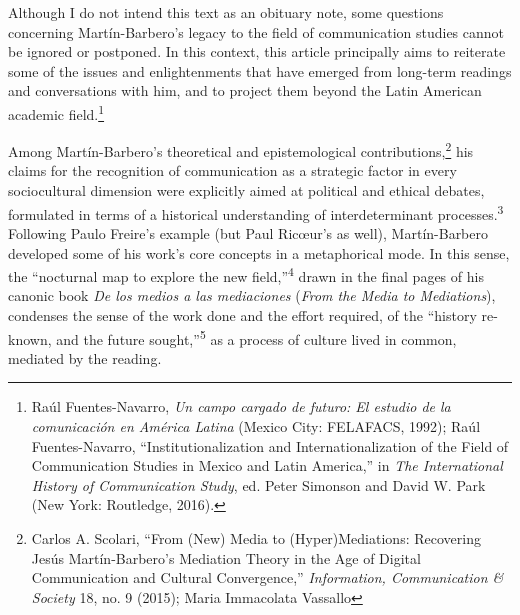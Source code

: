 \documentclass{tufte-handout}
\begin{document}
\begin{titlepage}
Although I do not intend this text as an obituary note, some questions
concerning Martín-Barbero's legacy to the field of communication studies
cannot be ignored or postponed. In this context, this article
principally aims to reiterate some of the issues and enlightenments that
have emerged from long-term readings and conversations with him, and to
project them beyond the Latin American academic
field.\footnote{Raúl Fuentes-Navarro, \emph{Un campo cargado de futuro: El estudio de
  la comunicación en América Latina} (Mexico City: FELAFACS, 1992); Raúl
  Fuentes-Navarro, ``Institutionalization and Internationalization of
  the Field of Communication Studies in Mexico and Latin America,'' in
  \emph{The International History of Communication Study}, ed. Peter
  Simonson and David W. Park (New York: Routledge, 2016).
}

Among Martín-Barbero's theoretical and epistemological
contributions,\footnote{Carlos A. Scolari, ``From (New) Media to (Hyper)Mediations: Recovering
  Jesús Martín-Barbero's Mediation Theory in the Age of Digital
  Communication and Cultural Convergence,'' \emph{Information,
  Communication \& Society} 18, no. 9 (2015); Maria Immacolata Vassallo}
his claims for the
recognition of communication as a strategic factor in every
sociocultural dimension were explicitly aimed at political and ethical
debates, formulated in terms of a historical understanding of
interdeterminant processes.\textsuperscript{3}
Following Paulo Freire's example (but Paul Ricœur's as well),
Martín-Barbero developed some of his work's core concepts in a
metaphorical mode. In this sense, the ``nocturnal map to explore the new
field,''\textsuperscript{4} drawn in the final pages
of his canonic book \emph{De los medios a las mediaciones} (\emph{From
the Media to Mediations}), condenses the sense of the work done and the
effort required, of the ``history re-known, and the future
sought,''\textsuperscript{5} as a process of culture
lived in common, mediated by the reading.

\enlargethispage{3\baselineskip}

\vspace*{2em}





 \end{titlepage}
\end{document}
